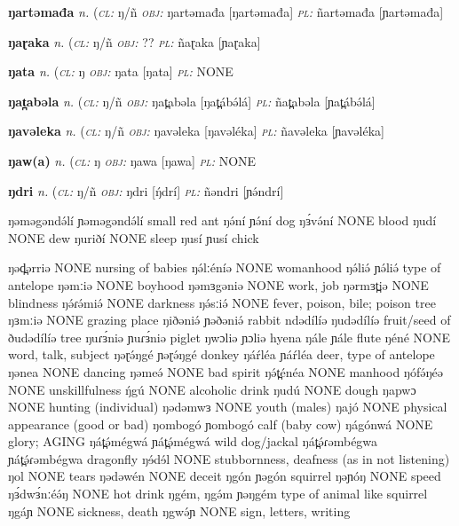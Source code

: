 {\newentry
\headword\textbf{ŋartəmađa}  
\ipa{[ŋáɾtə́máðá]}
\synpos\textit{n.} 
\class(\textit{\textsc{cl:}} {ŋ/ñ}
\object\textit{\textsc{obj:}} ŋartəmađa [ŋartəmađa]
\plural\textit{\textsc{pl:}} ñartəmađa [ɲartəmađa]

\newentry
\headword\textbf{ŋaɽaka}  
\ipa{[ŋáɽáká]}
\synpos\textit{n.} 
\class(\textit{\textsc{cl:}} {ŋ/ñ}
\object\textit{\textsc{obj:}} ??
\plural\textit{\textsc{pl:}} ñaɽaka [ɲaɽaka]

\newentry
\headword\textbf{ŋata}  
\ipa{[ŋata]}
\synpos\textit{n.} 
\class(\textit{\textsc{cl:}} {ŋ}
\object\textit{\textsc{obj:}} ŋata [ŋata]
\plural\textit{\textsc{pl:}} NONE 

\newentry
\headword\textbf{ŋat̪abəla}  
\ipa{[ŋat̪ábə́lá]}
\synpos\textit{n.} 
\class(\textit{\textsc{cl:}} {ŋ/ñ}
\object\textit{\textsc{obj:}} ŋat̪abəla [ŋat̪ábə́lá]
\plural\textit{\textsc{pl:}} ñat̪abəla [ɲat̪ábə́lá]

\newentry
\headword\textbf{ŋavəleka}  
\ipa{[ŋavəléka]}
\synpos\textit{n.} 
\class(\textit{\textsc{cl:}} {ŋ/ñ}
\object\textit{\textsc{obj:}} ŋavəleka [ŋavəléka]
\plural\textit{\textsc{pl:}} ñavəleka [ɲavəléka]

\newentry
\headword\textbf{ŋaw(a)}  
\ipa{[ŋaw(a)]}
\synpos\textit{n.} 
\class(\textit{\textsc{cl:}} {ŋ}
\object\textit{\textsc{obj:}} ŋawa [ŋawa]
\plural\textit{\textsc{pl:}} NONE

\newentry
\headword\textbf{ŋdri}  
\ipa{[ŋ́drí]}
\synpos\textit{n.} 
\class(\textit{\textsc{cl:}} {ŋ/ñ}
\object\textit{\textsc{obj:}} ŋdri [ŋ́drí]
\plural\textit{\textsc{pl:}} ñəndri [ɲə́ndrí]


		
ŋəməgəndə́lí	ɲəməgəndə́lí	small red ant
ŋə́ní	ɲə́ní	dog
ŋɜ́və́ní	NONE	blood
ŋudí	NONE	dew
ŋuriðí	NONE	sleep
ŋusí	ɲusí	chick

ŋəd̪ərriə	NONE	nursing of babies
ŋə́lːéníə	NONE	womanhood
ŋə́liə́	ɲə́liə́	type of antelope
ŋəmːiə	NONE	boyhood
ŋəmɜgəniə	NONE	work, job
ŋərmɜt̪iə	NONE	blindness
ŋə́ɾə́miə́	NONE	darkness
ŋə́sːiə́	NONE	fever, poison, bile; poison tree
ŋɜmːiə	NONE	grazing place
ŋiðəniə́	ɲəðəniə́	rabbit
ndədílíə	ŋudədílíə	fruit/seed of ðudədílíə tree
ŋuɾɜ́niə	ɲuɾɜ́niə	piglet
ŋwɔliə	ɲɔliə	hyena
ŋále	ɲále	flute
ŋéné	NONE	word, talk, subject
ŋəɽə́ŋgé	ɲəɽə́ŋgé	donkey
ŋáŕléa	ɲáŕléa	deer, type of antelope
ŋənea	NONE	dancing
ŋəmeə́	NONE	bad spirit
ŋə́t̪énéa	NONE	manhood
ŋófə́ŋéə	NONE	unskillfulness
ŋ́gú	NONE	alcoholic drink
ŋudú	NONE	dough
ŋapwɔ	NONE	hunting (individual)
ŋədəmwɜ	NONE	youth (males)
ŋajó	NONE	physical appearance (good or bad)
ŋombogó	ɲombogó	calf (baby cow)
ŋágónwá	NONE	glory; AGING
ŋát̪ə́mégwá	ɲát̪ə́mégwá	wild dog/jackal
ŋát̪ə́ɾəmbégwa	ɲát̪ə́ɾəmbégwa	dragonfly
ŋɘ́dɘ́l	NONE	stubbornness, deafness (as in not listening)
ŋol	NONE	tears
ŋədəwén	NONE	deceit
ŋgón	ɲəgón	squirrel
ŋəɲóŋ	NONE	speed
ŋɜ́dwɜ́nːéə́ŋ	NONE	hot drink
ŋgém, ŋgə́m	ɲəŋgém	type of animal like squirrel
ŋgáɲ	NONE	sickness, death
ŋgwə́ɲ	NONE	sign, letters, writing

}

